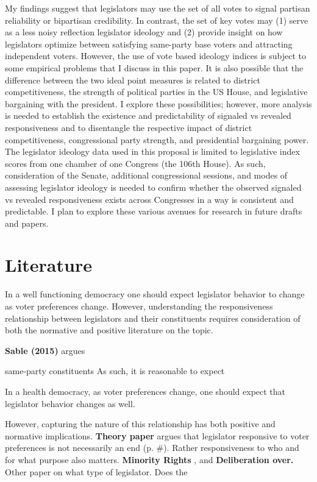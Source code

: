 \documentclass[10pt,letterpaper]{article}
\begin{document}
My findings suggest that legislators may use the set of all votes to signal partisan reliability or bipartisan credibility. In contrast, the set of key votes may (1) serve as a less noisy reflection legislator ideology and (2) provide insight on how legislators optimize between satisfying same-party base voters and attracting independent voters. However, the use of vote based ideology indices is subject to some empirical problems that I discuss in this paper. It is also possible that the difference between the two ideal point measures is related to district competitiveness, the strength of political parties in the US House, and legislative bargaining with the president. I explore these possibilities; however, more analysis is needed to establish the existence and predictability of signaled vs revealed responsiveness and to disentangle the respective impact of district competitiveness, congressional party strength, and presidential bargaining power. The legislator ideology data used in this proposal is limited to legislative index scores from one chamber of one Congress (the 106th House). As such, consideration of the Senate, additional congressional sessions, and modes of assessing legislator ideology is needed to confirm whether the observed signaled vs revealed responsiveness exists across Congresses in a way is consistent and predictable. I plan to explore these various avenues for research in future drafts and papers.

\section{Literature} 
In a well functioning democracy one should expect legislator behavior to change as voter preferences change. However, understanding the responsiveness relationship between legislators and their constituents requires consideration of both the normative and positive literature on the topic. 

\textbf{Sable (2015)} argues 


same-party constituents  
As such, it is reasonable to expect 

In a health democracy, as voter preferences change, one should expect that legislator behavior changes as well.

However, capturing the nature of this relationship has both positive and normative implications. \textbf{Theory paper} argues that legislator responsive to voter preferences is not necessarily an end (p. \#). Rather responsiveness to who and for what purpose also matters. \textbf{Minority Rights} , and \textbf{Deliberation over.} Other paper on what type of legislator. Does the %
\end{document}
